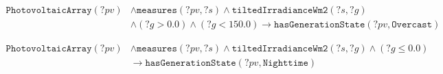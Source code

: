 \begin{equation}
\begin{aligned}
\texttt{PhotovoltaicArray}(?pv) &\wedge \texttt{measures}(?pv, ?s) \wedge \texttt{tiltedIrradianceWm2}(?s, ?g) \\
&\wedge (?g > 0.0) \wedge (?g < 150.0) \longrightarrow \texttt{hasGenerationState}(?pv, \texttt{Overcast})
\end{aligned}
\end{equation}

\begin{equation}
\begin{aligned}
\texttt{PhotovoltaicArray}(?pv) &\wedge \texttt{measures}(?pv, ?s) \wedge \texttt{tiltedIrradianceWm2}(?s, ?g) \wedge (?g \le 0.0) \\
&\longrightarrow \texttt{hasGenerationState}(?pv, \texttt{Nighttime})
\end{aligned}
\end{equation}

